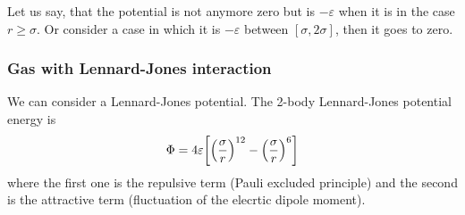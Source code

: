 \documentclass[../main/main.tex]{subfiles}
\begin{document}
Let us say, that the potential is not anymore zero but is \( - \varepsilon  \) when it is in the case \( r \ge \sigma \). Or consider a case in which it is \( - \varepsilon  \) between \( [\sigma ,2 \sigma ] \), then it goes to zero.
\subsubsection{Gas with Lennard-Jones interaction}
We can consider a Lennard-Jones potential. The 2-body Lennard-Jones potential energy is
\begin{equation}
  \Phi = 4 \varepsilon \qty[\qty(\frac{\sigma }{r})^{12} - \qty(\frac{\sigma }{r})^6  ]
\end{equation}
where the first one is the repulsive term (Pauli excluded principle) and the second is the attractive term (fluctuation of the elecrtic dipole moment).
\end{document}
